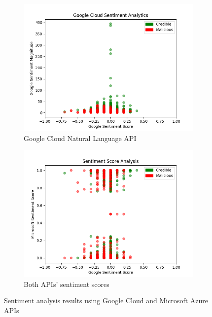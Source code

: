\begin{figure}
\centering
\captionsetup{justification=centering,width=0.95\textwidth}
    \begin{subfigure}[h]{0.5\textwidth}
            \centering
            \includegraphics[width=\linewidth]{googleCloudSentiment.png}
            \caption[Google Sentiment Score vs Magnitude]{
                 Google Cloud Natural Language API 
            }
            \label{fig:googleCloudSentiment}
    \end{subfigure}\hfill
    \begin{subfigure}[h]{0.5\textwidth}
            \centering
            \includegraphics[width=\linewidth]{sentimentScoreAnalysis.png}
            \caption[Sentiment Scores: Google vs Microsoft]{
                Both APIs' sentiment scores
            }
            \label{fig:googleMicrosoftSentiment}
    \end{subfigure}\hfill
    \caption[Sentiment Analysis API Results]{
        Sentiment analysis results using Google Cloud and Microsoft Azure APIs
    }
\label{fig:sentimentScoreAnalysis}
\end{figure}



